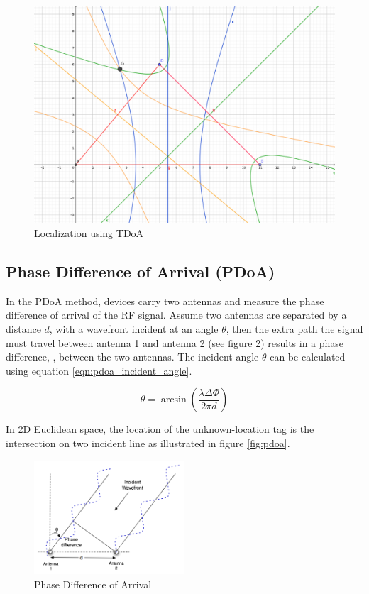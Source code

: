 \documentclass[\main/main.tex]{subfiles}
\begin{document}
\begin{figure}[H]
    \centering
    \includegraphics[width=1\textwidth]{tdoa.png}
    \caption{Localization using TDoA}
    \label{fig:tdoa}
\end{figure}

\subsection{Phase Difference of Arrival (PDoA)}
In the PDoA method, devices carry two antennas and measure the phase difference of arrival of the RF signal. Assume two antennas are separated by a distance $d$, with a wavefront incident at an angle $\theta$, then the extra path the signal must travel between antenna 1 and antenna 2 (see figure \ref{fig:PhaseInterferometry}) results in a phase difference, \Delta\Phi, between the two antennas. The incident angle $\theta$ can be calculated using equation \ref{eqn:pdoa_incident_angle}.

\begin{equation}
    \theta = \arcsin(\frac{\lambda\Delta\Phi}{2\pi d})
    \label{eqn:pdoa_incident_angle}
\end{equation}

In 2D Euclidean space, the location of the unknown-location tag is the intersection on two incident line as illustrated in figure \ref{fig:pdoa}.
\begin{figure}[H]
    \centering
    \includegraphics[width=0.5\textwidth]{PhaseInterferometry.png}
    \caption{Phase Difference of Arrival}
    \label{fig:PhaseInterferometry}
\end{figure}
\end{document}
